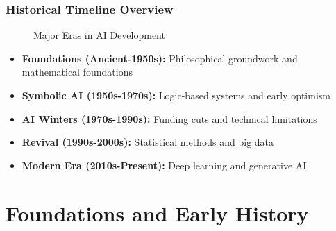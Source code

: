 \documentclass{beamer}
\begin{document}
\begin{frame}
    \frametitle{Historical Timeline Overview}
    \begin{figure}
        \centering
        \caption{Major Eras in AI Development}
    \end{figure}
    
    \begin{itemize}
        \item \textcolor{MyBlue}{\textbf{Foundations (Ancient-1950s):}} Philosophical groundwork and mathematical foundations
        \item \textcolor{MyBlue}{\textbf{Symbolic AI (1950s-1970s):}} Logic-based systems and early optimism
        \item \textcolor{MyBlue}{\textbf{AI Winters (1970s-1990s):}} Funding cuts and technical limitations
        \item \textcolor{MyBlue}{\textbf{Revival (1990s-2000s):}} Statistical methods and big data
        \item \textcolor{MyBlue}{\textbf{Modern Era (2010s-Present):}} Deep learning and generative AI
    \end{itemize}
\end{frame}

\section{Foundations and Early History}
\end{document}

